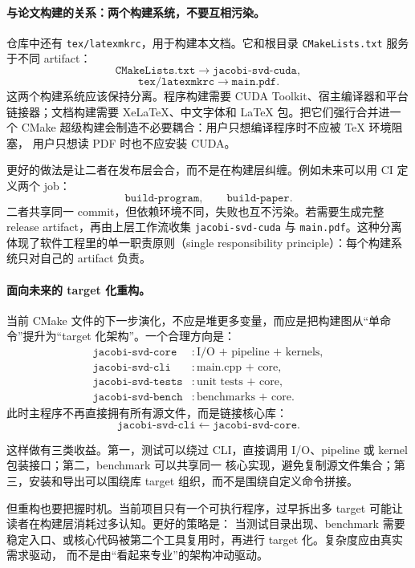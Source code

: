 \paragraph{与论文构建的关系：两个构建系统，不要互相污染。}

仓库中还有 \texttt{tex/latexmkrc}，用于构建本文档。它和根目录 \texttt{CMakeLists.txt} 服务于不同 artifact：
\[
    \texttt{CMakeLists.txt}
    \longrightarrow
    \texttt{jacobi-svd-cuda},
\]
\[
    \texttt{tex/latexmkrc}
    \longrightarrow
    \texttt{main.pdf}.
\]
这两个构建系统应该保持分离。程序构建需要 CUDA Toolkit、宿主编译器和平台链接器；文档构建需要 XeLaTeX、中文字体和
LaTeX 包。把它们强行合并进一个 CMake 超级构建会制造不必要耦合：用户只想编译程序时不应被 TeX 环境阻塞，
用户只想读 PDF 时也不应安装 CUDA。

更好的做法是让二者在发布层会合，而不是在构建层纠缠。例如未来可以用 CI 定义两个 job：
\[
    \texttt{build-program},\qquad \texttt{build-paper}.
\]
二者共享同一 commit，但依赖环境不同，失败也互不污染。若需要生成完整 release artifact，再由上层工作流收集
\texttt{jacobi-svd-cuda} 与 \texttt{main.pdf}。这种分离体现了软件工程里的单一职责原则（single responsibility
principle）：每个构建系统只对自己的 artifact 负责。

\paragraph{面向未来的 target 化重构。}

当前 CMake 文件的下一步演化，不应是堆更多变量，而应是把构建图从“单命令”提升为“target 化架构”。一个合理方向是：
\[
    \begin{aligned}
        \texttt{jacobi-svd-core}  & : \text{I/O + pipeline + kernels}, \\
        \texttt{jacobi-svd-cli}   & : \text{main.cpp + core},          \\
        \texttt{jacobi-svd-tests} & : \text{unit tests + core},        \\
        \texttt{jacobi-svd-bench} & : \text{benchmarks + core}.
    \end{aligned}
\]
此时主程序不再直接拥有所有源文件，而是链接核心库：
\[
    \texttt{jacobi-svd-cli}
    \longleftarrow
    \texttt{jacobi-svd-core}.
\]

这样做有三类收益。第一，测试可以绕过 CLI，直接调用 I/O、pipeline 或 kernel 包装接口；第二，benchmark 可以共享同一
核心实现，避免复制源文件集合；第三，安装和导出可以围绕库 target 组织，而不是围绕自定义命令拼接。

但重构也要把握时机。当前项目只有一个可执行程序，过早拆出多 target 可能让读者在构建层消耗过多认知。更好的策略是：
当测试目录出现、benchmark 需要稳定入口、或核心代码被第二个工具复用时，再进行 target 化。复杂度应由真实需求驱动，
而不是由“看起来专业”的架构冲动驱动。

